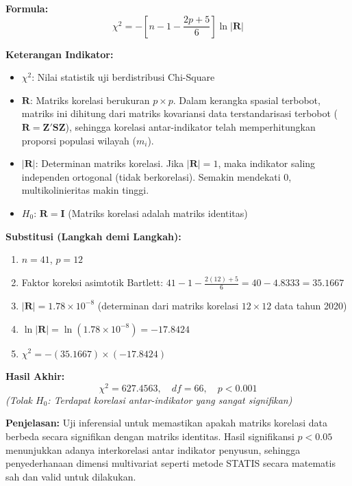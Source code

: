 \documentclass[11pt,a4paper]{article}
\begin{document}
\begin{tcolorbox}[formula_box, title={12. Uji Sferisitas Bartlett (\textit{Bartlett's Test of Sphericity})}] \label{kotak:bartlett}
\textbf{Formula:}
\[ \chi^2 = -\left[n - 1 - \frac{2p+5}{6}\right] \ln|\mathbf{R}| \]

\textbf{Keterangan Indikator:}
\begin{itemize}
  \item $\chi^2$: Nilai statistik uji berdistribusi Chi-Square
  \item $\mathbf{R}$: Matriks korelasi berukuran $p \times p$. Dalam kerangka spasial terbobot, matriks ini dihitung dari matriks kovariansi data terstandarisasi terbobot ($\mathbf{R} = \mathbf{Z}' \mathbf{S} \mathbf{Z}$), sehingga korelasi antar-indikator telah memperhitungkan proporsi populasi wilayah ($m_i$).
  \item $|\mathbf{R}|$: Determinan matriks korelasi. Jika $|\mathbf{R}| = 1$, maka indikator saling independen ortogonal (tidak berkorelasi). Semakin mendekati $0$, multikolinieritas makin tinggi.
  \item $H_0$: $\mathbf{R} = \mathbf{I}$ (Matriks korelasi adalah matriks identitas)
\end{itemize}

\textbf{Substitusi (Langkah demi Langkah):}
\begin{enumerate}
  \item $n = 41$, $p = 12$
  \item Faktor koreksi asimtotik Bartlett: $41 - 1 - \frac{2(12)+5}{6} = 40 - 4.8333 = 35.1667$
  \item $|\mathbf{R}| = 1.78 \times 10^{-8}$ (determinan dari matriks korelasi $12\times12$ data tahun 2020)
  \item $\ln|\mathbf{R}| = \ln(1.78 \times 10^{-8}) = -17.8424$
  \item $\chi^2 = -(35.1667) \times (-17.8424)$
\end{enumerate}

\textbf{Hasil Akhir:}
\[ \chi^2 = 627.4563, \quad df = 66, \quad p < 0.001 \]
\textit{(Tolak $H_0$: Terdapat korelasi antar-indikator yang sangat signifikan)}

\textbf{Penjelasan:} Uji inferensial \citet{bartlett1954} untuk memastikan apakah matriks korelasi data berbeda secara signifikan dengan matriks identitas. Hasil signifikansi $p < 0.05$ menunjukkan adanya interkorelasi antar indikator penyusun, sehingga penyederhanaan dimensi multivariat seperti metode STATIS \citep{lavit94} secara matematis sah dan valid untuk dilakukan.
\end{tcolorbox}
\end{document}

